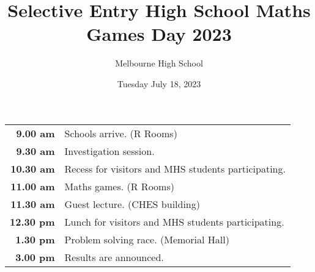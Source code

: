 \documentclass[a4paper,12pt]{article}
\title{Selective Entry High School Maths Games Day 2023}
\author{Melbourne High School}
\date{Tuesday July 18, 2023}
\begin{document}
\maketitle
\begin{tabular}{rl}
	\textbf{9.00 am}&Schools arrive. (R Rooms)\\

	\textbf{9.30 am}&Investigation session.\\

	\textbf{10.30 am}&Recess for visitors and MHS students participating.\\

	\textbf{11.00 am}&Maths games. (R Rooms)\\

	\textbf{11.30 am}&Guest lecture. (CHES building)\\

	\textbf{12.30 pm}&Lunch for visitors and MHS students participating.\\

	\textbf{1.30 pm}&Problem solving race. (Memorial Hall)\\

	\textbf{3.00 pm}&Results are announced.\\
\end{tabular}
\end{document}
